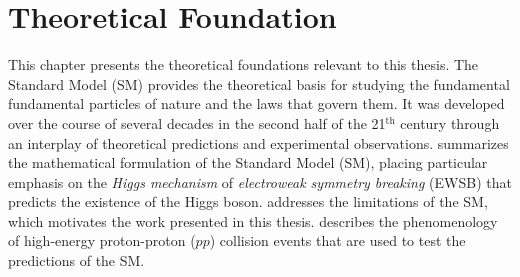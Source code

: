 \chapter{Theoretical Foundation}
\label{chap:theory}
This chapter presents the theoretical foundations relevant to this thesis.  
The Standard Model (SM) provides the theoretical basis for studying the fundamental fundamental particles of nature and the laws that govern them. It was developed over the course of several decades in the second half of the 21$^{\text{th}}$ century through an interplay of theoretical predictions and experimental observations.
 summarizes the mathematical formulation of the Standard Model (SM), placing particular emphasis on the \emph{Higgs mechanism} of \emph{electroweak symmetry breaking} (EWSB) that predicts the existence of the Higgs boson.
 addresses the limitations of the SM, which motivates the work presented in this thesis. 
 describes the phenomenology of high-energy proton-proton ($pp$) collision events that are used to test the predictions of the SM.



